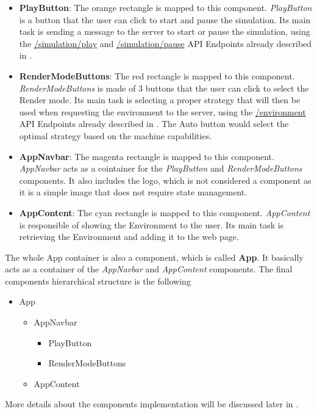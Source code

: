 \begin{itemize}
	\item \textbf{PlayButton}: The orange rectangle is mapped to this component. \textit{PlayButton} is a button that the user can click to start and pause the simulation. Its main task is sending a message to the server to start or pause the simulation, using the \url{/simulation/play} and \url{/simulation/pause} API Endpoints already described in .
	\item \textbf{RenderModeButtons}: The red rectangle is mapped to this component. \textit{RenderModeButtons} is made of 3 buttons that the user can click to select the Render mode. Its main task is selecting a proper strategy that will then be used when requesting the environment to the server, using the \url{/environment} API Endpoints already described in . The Auto button would select the optimal strategy based on the machine capabilities.
	\item \textbf{AppNavbar}: The magenta rectangle is mapped to this component. \textit{AppNavbar} acts as a cointainer for the \textit{PlayButton} and \textit{RenderModeButtons} components. It also includes the logo, which is not considered a component as it is a simple image that does not require state management.
	\item \textbf{AppContent}: The cyan rectangle is mapped to this component. \textit{AppContent} is responsible of showing the Environment to the user. Its main task is retrieving the Environment and adding it to the web page.
\end{itemize}

The whole App container is also a component, which is called \textbf{App}. It basically acts as a container of the \textit{AppNavbar} and \textit{AppContent} components. The final components hierarchical structure is the following
\begin{itemize}
	\item App
	\begin{itemize}
		\item AppNavbar
		\begin{itemize}
			\item PlayButton
			\item RenderModeButtons
		\end{itemize}
		\item AppContent
	\end{itemize}
\end{itemize}
More details about the components implementation will be discussed later in .

